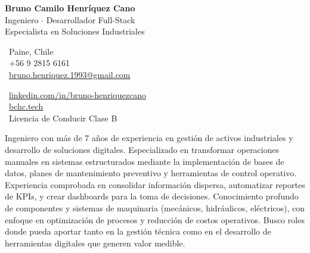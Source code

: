 \documentclass[10pt,letterpaper]{article}
\begin{document}
\begin{center}
    {\Huge \textbf{Bruno Camilo Henríquez Cano}} \\[0.3cm]
    {\Large Ingeniero $\cdot$ Desarrollador Full-Stack} \\[0.1cm]
    {\Large Especialista en Soluciones Industriales}
\end{center}

\vspace{0.3cm}

\noindent
\begin{minipage}[t]{0.5\textwidth}
    \faMapMarker\ Paine, Chile \\
    \faPhone\ +56 9 2815 6161 \\
    \faEnvelope\ \href{mailto:bruno.henriquez.1993@gmail.com}{bruno.henriquez.1993@gmail.com}
\end{minipage}
\begin{minipage}[t]{0.5\textwidth}
    \faLinkedin\ \href{https://linkedin.com/in/bruno-henriquezcano}{linkedin.com/in/bruno-henriquezcano} \\
    \faGlobe\ \href{https://bchc.tech}{bchc.tech} \\
    \faCar\ Licencia de Conducir Clase B
\end{minipage}

\vspace{0.4cm}


\vspace{0.2cm}

\noindent Ingeniero con más de 7 años de experiencia en gestión de activos industriales y desarrollo de soluciones digitales. Especializado en transformar operaciones manuales en sistemas estructurados mediante la implementación de bases de datos, planes de mantenimiento preventivo y herramientas de control operativo. Experiencia comprobada en consolidar información dispersa, automatizar reportes de KPIs, y crear dashboards para la toma de decisiones. Conocimiento profundo de componentes y sistemas de maquinaria (mecánicos, hidráulicos, eléctricos), con enfoque en optimización de procesos y reducción de costos operativos. Busco roles donde pueda aportar tanto en la gestión técnica como en el desarrollo de herramientas digitales que generen valor medible.

\vspace{0.4cm}

\end{document}
